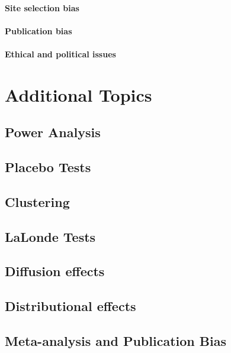 \documentclass[]{book}
\theoremstyle{definition}
\theoremstyle{definition}
\theoremstyle{definition}
\theoremstyle{remark}
\begin{document}
\subsection{Site selection bias}\label{site-selection-bias}

\subsection{Publication bias}\label{publication-bias}

\subsection{Ethical and political
issues}\label{ethical-and-political-issues}

\part{Additional Topics}\label{part-additional-topics}

\chapter{Power Analysis}\label{Power}

\chapter{Placebo Tests}\label{Placebo}

\chapter{Clustering}\label{cluster}

\chapter{LaLonde Tests}\label{LaLonde}

\chapter{Diffusion effects}\label{Diffusion}

\chapter{Distributional effects}\label{Distribution}

\chapter{Meta-analysis and Publication Bias}\label{sec:meta}
\end{document}
